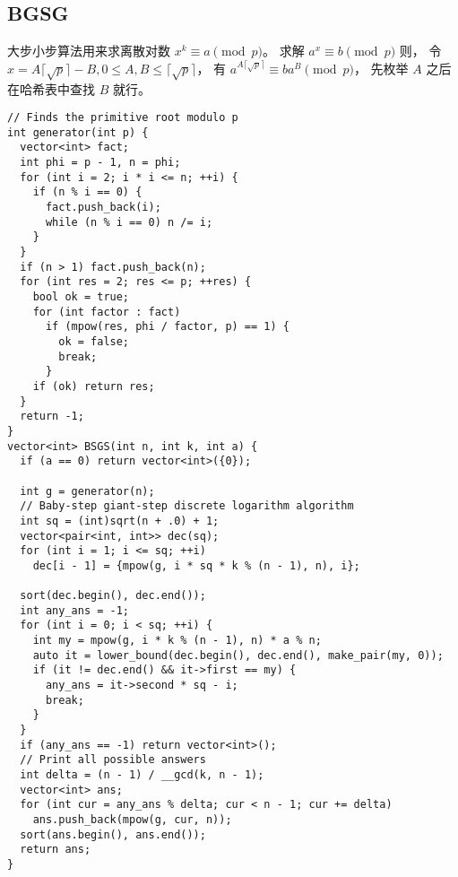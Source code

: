 \subsection{BGSG}
大步小步算法用来求离散对数 $x^{k} \equiv a \pmod p$。
求解 $a^{x} \equiv b \pmod p$ 则，
令 $x = A\lceil\sqrt{p}\rceil - B, 0 \le A, B \le \lceil\sqrt{p}\rceil$，
有 $a^{A\lceil\sqrt{p}\rceil} \equiv b a^{B} \pmod p$，
先枚举 $A$ 之后在哈希表中查找 $B$ 就行。
\begin{lstlisting}
// Finds the primitive root modulo p
int generator(int p) {
  vector<int> fact;
  int phi = p - 1, n = phi;
  for (int i = 2; i * i <= n; ++i) {
    if (n % i == 0) {
      fact.push_back(i);
      while (n % i == 0) n /= i;
    }
  }
  if (n > 1) fact.push_back(n);
  for (int res = 2; res <= p; ++res) {
    bool ok = true;
    for (int factor : fact)
      if (mpow(res, phi / factor, p) == 1) {
        ok = false;
        break;
      }
    if (ok) return res;
  }
  return -1;
}
vector<int> BSGS(int n, int k, int a) {
  if (a == 0) return vector<int>({0});

  int g = generator(n);
  // Baby-step giant-step discrete logarithm algorithm
  int sq = (int)sqrt(n + .0) + 1;
  vector<pair<int, int>> dec(sq);
  for (int i = 1; i <= sq; ++i)
    dec[i - 1] = {mpow(g, i * sq * k % (n - 1), n), i};

  sort(dec.begin(), dec.end());
  int any_ans = -1;
  for (int i = 0; i < sq; ++i) {
    int my = mpow(g, i * k % (n - 1), n) * a % n;
    auto it = lower_bound(dec.begin(), dec.end(), make_pair(my, 0));
    if (it != dec.end() && it->first == my) {
      any_ans = it->second * sq - i;
      break;
    }
  }
  if (any_ans == -1) return vector<int>();
  // Print all possible answers
  int delta = (n - 1) / __gcd(k, n - 1);
  vector<int> ans;
  for (int cur = any_ans % delta; cur < n - 1; cur += delta)
    ans.push_back(mpow(g, cur, n));
  sort(ans.begin(), ans.end());
  return ans;
}
\end{lstlisting}
